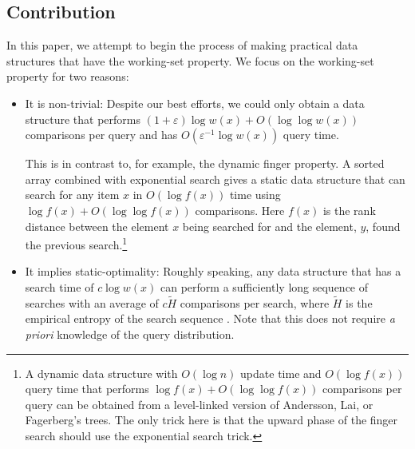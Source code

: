 \documentclass[lotsofwhite]{patmorin}
\begin{document}

\subsection{Contribution}

In this paper, we attempt to begin the process of making practical data
structures that have the working-set property.  We focus on the
working-set property for two reasons:

\begin{itemize}
\item It is non-trivial: Despite our best efforts, we could only obtain
    a data structure that performs $(1+\varepsilon)\log w(x) + O(\log\log
    w(x))$ comparisons per query and has $O(\varepsilon^{-1}\log w(x))$
    query time.

    This is in contrast to, for example, the dynamic finger property.
    A sorted array combined with exponential search gives a static data
    structure that can search for any item $x$ in $O(\log f(x))$ time
    using $\log f(x) + O(\log\log f(x))$ comparisons.  Here $f(x)$ is the rank distance between the element $x$ being searched for and the element, $y$, found the previous search.\footnote{A dynamic
    data structure with
    $O(\log n)$ update time and $O(\log f(x))$ query time
    that performs $\log f(x) + O(\log\log f(x))$ comparisons per query
    can be obtained from a level-linked version of Andersson, Lai, or
    Fagerberg's trees. The only trick here is that the upward
    phase of the finger search should use the exponential search trick.}

\item It implies static-optimality: Roughly speaking, any data structure
    that has a search time of $c\log w(x)$ can perform a sufficiently long
    sequence of searches with an average of $c\tilde{H}$ comparisons per
    search, where $\tilde{H}$ is the empirical entropy of the search
    sequence \cite{X,Y}.  Note that this does not require \emph{a
    priori} knowledge of the query distribution.  
\end{itemize}
\end{document}
